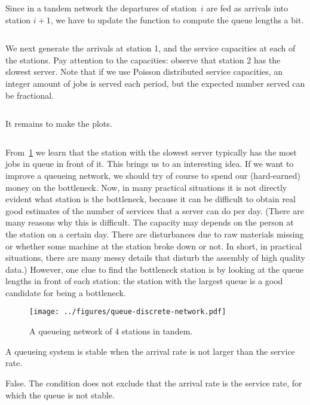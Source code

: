 \documentclass[stochastic-or.tex]{subfiles}
\begin{document}
Since in a tandem network the departures of station~$i$ are fed as arrivals into station $i+1$, we have to update the function to compute the queue lengths a bit.
\inputminted[firstline=135, lastline=144]{python}{../code/discrete_simulations.py} %

We next generate the arrivals at station 1, and the service capacities at each of the stations.
Pay attention to the capacities: observe that station 2 has the slowest server.
Note that if we use Poisson distributed service capacities, an integer amount of jobs is served each period, but the expected number served can be fractional.
\inputminted[firstline=151, lastline=160]{python}{../code/discrete_simulations.py} %

It remains to make the plots.
\inputminted[firstline=164, lastline=182]{python}{../code/discrete_simulations.py} %

From~\cref{fig:tandem} we learn that the station with the slowest server typically has the most jobs in queue in front of it.
This brings us to an interesting idea.
If we want to improve a queueing network, we should try of course to spend our (hard-earned) money on the bottleneck.
Now, in many practical situations it is not directly evident what station is the bottleneck, because it can be difficult to obtain real good estimates of the number of services that a server can do per day.
(There are many reasons why this is difficult.
The capacity may depends on the person at the station on a certain day.
There are disturbances due to raw materials missing or whether some machine at the station broke down or not.
In short, in practical situations, there are many messy details that disturb the assembly of high quality data.)
However, one clue to find the bottleneck station is by looking at the queue lengths in front of each station: the station with the largest queue is a good candidate for being a bottleneck.

\begin{figure}[tb]
\centering
\texttt{[image: ../figures/queue-discrete-network.pdf]}
\caption{A queueing network of 4 stations in tandem.}
\label{fig:tandem}
\end{figure}


\begin{truefalse}
    A queueing system is stable when the arrival rate is not larger than the service rate.
    \begin{solution}
        False. The condition does not exclude that the arrival rate is the service rate, for which the queue is not stable.
    \end{solution}
\end{truefalse}
\end{document}
